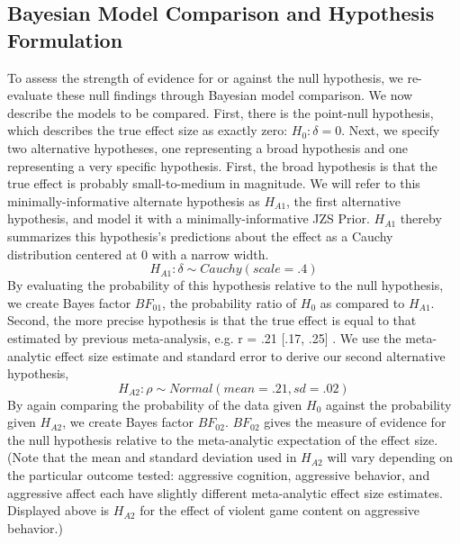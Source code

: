 \documentclass[fignum,nobf,man]{apa}
\begin{document}
\subsection{Bayesian Model Comparison and Hypothesis Formulation}
To assess the strength of evidence for or against the null hypothesis, we re-evaluate these null findings through Bayesian model comparison. We now describe the models to be compared. First, there is the point-null hypothesis, which describes the true effect size as exactly zero: $H_0: \delta = 0$. Next, we specify two alternative hypotheses, one representing a broad hypothesis and one representing a very specific hypothesis. First, the broad hypothesis is that the true effect is probably small-to-medium in magnitude. We will refer to this minimally-informative alternate hypothesis as $H_{A1}$, the first alternative hypothesis, and model it with a minimally-informative JZS Prior. $H_{A1}$ thereby summarizes this hypothesis's predictions about the effect as a Cauchy distribution centered at 0 with a narrow width.
\begin{equation}
H_{A1}: \delta{} \sim{} Cauchy(scale = .4) 
\end{equation}
By evaluating the probability of this hypothesis relative to the null hypothesis, we create Bayes factor $BF_{01}$, the probability ratio of $H_0$ as compared to $H_{A1}$. %
Second, the more precise hypothesis is that the true effect is equal to that estimated by previous meta-analysis, e.g. r = .21 [.17, .25] \citep{Anderson:etal:2010}.  We use the meta-analytic effect size estimate and standard error to derive our second alternative hypothesis,
\begin{equation}
H_{A2}: \rho{} \sim{} Normal(mean=.21, sd=.02)
\end{equation}
By again comparing the probability of the data given $H_0$ against the probability given $H_{A2}$, we create Bayes factor $BF_{02}$. $BF_{02}$ gives the measure of evidence for the null hypothesis relative to the meta-analytic expectation of the effect size. (Note that the mean and standard deviation used in $H_{A2}$ will vary depending on the particular outcome tested: aggressive cognition, aggressive behavior, and aggressive affect each have slightly different meta-analytic effect size estimates. Displayed above is $H_{A2}$ for the effect of violent game content on aggressive behavior.) %
\end{document}
